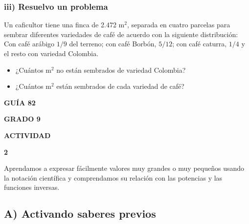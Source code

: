 \documentclass[12pt,a4paper]{article}
\begin{document}
\vspace{1cm}

\subsubsection*{iii) Resuelvo un problema}

Un caficultor tiene una finca de 2.472 m$^2$, separada en cuatro parcelas para sembrar diferentes variedades de café de acuerdo con la siguiente distribución: Con café arábigo $1/9$ del terreno; con café Borbón, $5/12$; con café caturra, $1/4$ y el resto con variedad Colombia.

\begin{itemize}
\item ¿Cuántos m$^2$ no están sembrados de variedad Colombia?
\item ¿Cuántos m$^2$ están sembrados de cada variedad de café?
\end{itemize}


\begin{center}
\begin{tcolorbox}[colback=fondoazul,colframe=azuloscuro,width=4cm]
\centering
\textbf{GUÍA 82}

\textbf{GRADO 9}

\vspace{0.3cm}

\textbf{ACTIVIDAD}

{\Huge\textbf{2}}
\end{tcolorbox}
\end{center}

\vspace{0.5cm}

\begin{center}
\begin{tcolorbox}[colback=fondorosa,colframe=rojoclaro,title=\textbf{ACTIVIDAD 2: LA NOTACIÓN CIENTÍFICA},fonttitle=\bfseries,width=\textwidth]
\centering
Aprendamos a expresar fácilmente valores muy grandes o muy pequeños usando la notación científica y comprendamos su relación con las potencias y las funciones inversas.
\end{tcolorbox}
\end{center}

\vspace{0.5cm}

\subsection*{A) Activando saberes previos}
\end{document}
